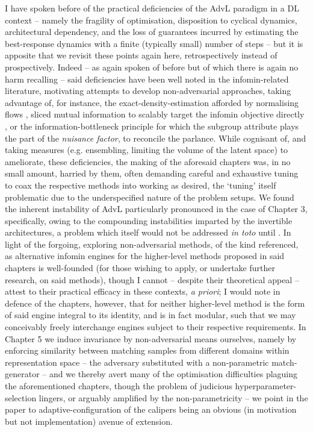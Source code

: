 %
I have spoken before of the practical deficiencies of the AdvL paradigm in a DL context --
namely the fragility of optimisation, disposition to cyclical dynamics, architectural dependency,
and the loss of guarantees incurred by estimating the best-response dynamics with a finite
(typically small) number of steps -- but it is apposite that we revisit these points again here,
retrospectively instead of prospectively.
%
Indeed -- as again spoken of before but of which there is again no harm recalling -- said
deficiencies have been well noted in the infomin-related literature, motivating attempts to develop
non-adversarial approaches, taking advantage of, for instance, the exact-density-estimation
afforded by normalising flows \citep{balunovic2021fair}, sliced mutual information
\citep{goldfeld2021sliced} to scalably target the infomin objective directly
\citep{chen2022scalable}, or the information-bottleneck principle \citep{tishby2015deep,
moyer2018invariant} for which the subgroup attribute plays the part of the \emph{nuisance factor},
to reconcile the parlance.
%
While cognisant of, and taking measures (e.g. ensembling, limiting the volume of the latent space)
to ameliorate, these deficiencies, the making of the aforesaid chapters was, in no small amount,
harried by them, often demanding careful and exhaustive tuning to coax the respective methods into
working as desired, the `tuning' itself problematic due to the underspecified nature of the problem
setups.
%
We found the inherent instability of AdvL particularly pronounced in the case of Chapter 3,
specifically, owing to the compounding instabilities imparted by the invertible architectures, a
problem which itself would not be addressed \emph{in toto} until \cite{behrmann2021understanding}.
%
In light of the forgoing, exploring non-adversarial methods, of the kind referenced, as alternative
infomin engines for the higher-level methods proposed in said chapters is well-founded (for those
wishing to apply, or undertake further research, on said methods), though I cannot -- despite their
theoretical appeal -- attest to their practical efficacy in these contexts, \emph{a priori}; I
would note in defence of the chapters, however, that for neither higher-level method is the form of
said engine integral to its identity, and is in fact modular, such that we may conceivably freely
interchange engines subject to their respective requirements.
%
In Chapter 5 we induce invariance by non-adversarial means ourselves, namely by enforcing
similarity between matching samples from different domains within representation space -- the
adversary substituted with a non-parametric match-generator -- and we thereby avert
many of the optimisation difficulties plaguing the aforementioned chapters, though the problem of
judicious hyperparameter-selection lingers, or arguably amplified by the non-parametricity -- we
point in the paper to adaptive-configuration of the calipers being an obvious (in motivation but
not implementation) avenue of extension.
%

